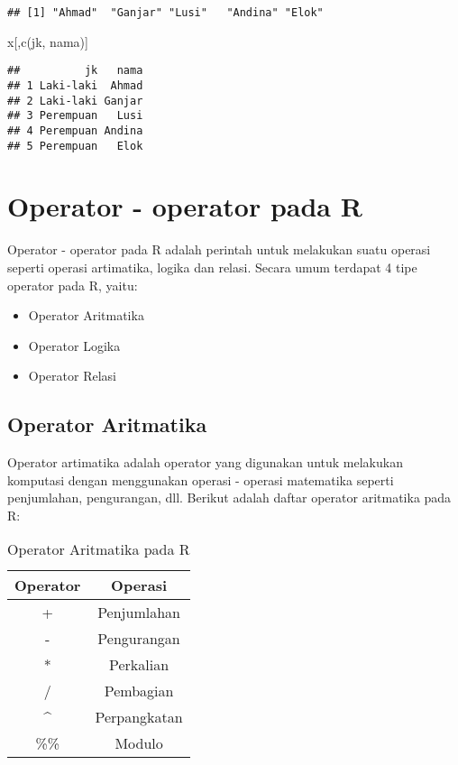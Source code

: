 \documentclass[
]{book}
\newenvironment{Shaded}{\begin{snugshade}}{\end{snugshade}}
\newcommand{\FunctionTok}[1]{\textcolor[rgb]{0.00,0.00,0.00}{#1}}
\newcommand{\NormalTok}[1]{#1}
\newcommand{\StringTok}[1]{\textcolor[rgb]{0.31,0.60,0.02}{#1}}
\providecommand{\tightlist}{%
  \setlength{\itemsep}{0pt}\setlength{\parskip}{0pt}}
\begin{document}
\begin{verbatim}
## [1] "Ahmad"  "Ganjar" "Lusi"   "Andina" "Elok"
\end{verbatim}

\begin{Shaded}
\begin{Highlighting}[]
\NormalTok{x[,}\FunctionTok{c}\NormalTok{(}\StringTok{\textquotesingle{}jk\textquotesingle{}}\NormalTok{, }\StringTok{\textquotesingle{}nama\textquotesingle{}}\NormalTok{)]}
\end{Highlighting}
\end{Shaded}

\begin{verbatim}
##          jk   nama
## 1 Laki-laki  Ahmad
## 2 Laki-laki Ganjar
## 3 Perempuan   Lusi
## 4 Perempuan Andina
## 5 Perempuan   Elok
\end{verbatim}

\hypertarget{operator---operator-pada-r}{%
\chapter{Operator - operator pada R}\label{operator---operator-pada-r}}

Operator - operator pada R adalah perintah untuk melakukan suatu operasi seperti operasi artimatika, logika dan relasi. Secara umum terdapat 4 tipe operator pada R, yaitu:

\begin{itemize}
\tightlist
\item
  Operator Aritmatika
\item
  Operator Logika
\item
  Operator Relasi
\end{itemize}

\hypertarget{operator}{%
\section{Operator Aritmatika}\label{operator}}

Operator artimatika adalah operator yang digunakan untuk melakukan komputasi dengan menggunakan operasi - operasi matematika seperti penjumlahan, pengurangan, dll. Berikut adalah daftar operator aritmatika pada R:

\begin{table}

\caption{\label{tab:unnamed-chunk-23}Operator Aritmatika pada R}
\centering
\begin{tabular}[t]{cc}
\toprule
Operator & Operasi\\
\midrule
+ & Penjumlahan\\
- & Pengurangan\\
* & Perkalian\\
/ & Pembagian\\
\textasciicircum{} & Perpangkatan\\
\addlinespace
\%\% & Modulo\\
\bottomrule
\end{tabular}
\end{table}
\end{document}
